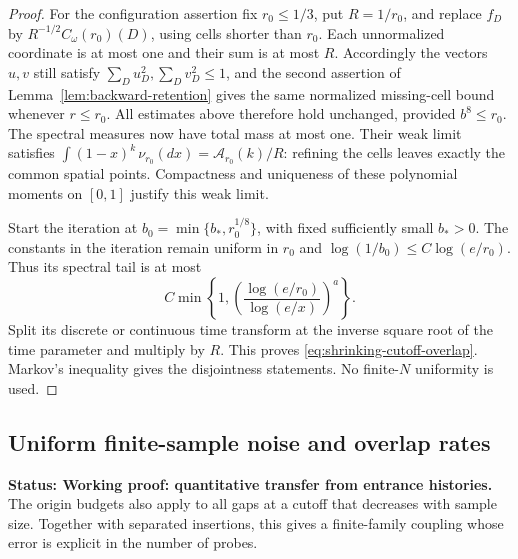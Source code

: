 \documentclass[11pt,letterpaper]{article}
\newcommand{\status}[1]{\textbf{Status: #1.}}
\begin{document}
\begin{proof}
For the configuration assertion fix $r_0\le1/3$, put $R=1/r_0$,
and replace $f_D$ by $R^{-1/2}C_\omega(r_0)(D)$, using cells shorter
than $r_0$. Each unnormalized coordinate is at most one and their
sum is at most $R$. Accordingly the vectors $u,v$ still satisfy
$\sum_Du_D^2,\sum_Dv_D^2\le1$, and the second assertion of
Lemma~\ref{lem:backward-retention} gives the same normalized
missing-cell bound whenever $r\le r_0$.
All estimates above therefore hold unchanged, provided $b^8\le r_0$.
The spectral measures now have total mass at most one. Their weak
limit satisfies $\int(1-x)^k\,\nu_{r_0}(dx)=\mathcal A_{r_0}(k)/R$:
refining the cells leaves exactly the common spatial points.
Compactness and uniqueness of these polynomial moments on $[0,1]$
justify this weak limit.

Start the iteration at
$b_0=\min\{b_*,r_0^{1/8}\}$, with fixed sufficiently small $b_*>0$.
The constants in the iteration remain uniform in $r_0$ and
$\log(1/b_0)\le C\log(e/r_0)$. Thus its spectral tail is at most
\[
 C\min\left\{1,
     \left(\frac{\log(e/r_0)}{\log(e/x)}\right)^a\right\}.
\]
Split its discrete or continuous time transform at the inverse
square root of the time parameter and multiply by $R$.
This proves \eqref{eq:shrinking-cutoff-overlap}. Markov's inequality
gives the disjointness statements. No finite-$N$ uniformity is used.
\end{proof}

\subsection{Uniform finite-sample noise and overlap rates}
\label{sec:finite-family-rate}

\status{Working proof: quantitative transfer from entrance histories}
The origin budgets also apply to all gaps at a cutoff that decreases
with sample size. Together with separated insertions, this gives a
finite-family coupling whose error is explicit in the number of probes.
\end{document}
